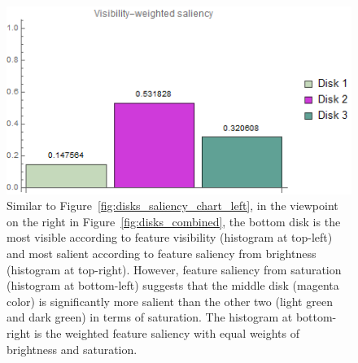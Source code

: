 \begin{figure}
\begin{minipage}{.2\textwidth}
	\end{minipage}~
	\begin{minipage}{.2\textwidth}
		\includegraphics[width=1\linewidth]{images/disk_visibility_saliency_weighted_chart_right.png}
	\end{minipage}
	\caption{Similar to Figure~\ref{fig:disks_saliency_chart_left}, in the viewpoint on the right in Figure~\ref{fig:disks_combined}, the bottom disk is the most visible according to feature visibility (histogram at top-left) and most salient according to feature saliency from brightness (histogram at top-right). However, feature saliency from saturation (histogram at bottom-left) suggests that the middle disk (magenta color) is significantly more salient than the other two (light green and dark green) in terms of saturation. The histogram at bottom-right is the weighted feature saliency with equal weights of brightness and saturation.}
	\label{fig:disks_saliency_chart_right}
\end{figure}


